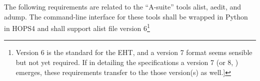 The following requirements are related to the ``A-suite'' tools \acs{alist}, \acs{aedit},
and \acs{adump}.  The command-line interface for these tools shall be wrapped
in Python in HOPS4 and shall support alist file version 6\footnote{Version 6 is the standard for the \ac{EHT}, and a version 7 format seems
sensible but not yet required.  If in detailing the specifications
a version 7 (or 8, \etc) emerges, these requirements transfer
to the those version(s) as well.]}




